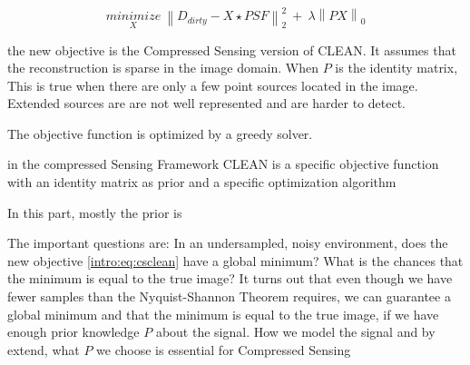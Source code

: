 \begin{equation}\label{intro:eq:csclean}
\underset{X}{minimize} \: \left \| D_{dirty} -X \star PSF \right \|_2^2 \: + \: \lambda \left \| PX \right \|_0
\end{equation}

 the new objective is the Compressed Sensing version of CLEAN. It assumes that the reconstruction is sparse in the image domain. When $P$ is the identity matrix, This is true when there are only a few point sources located in the image. Extended sources are are not well represented and are harder to detect. 
 
 The objective function is optimized by a greedy solver. 

in the compressed Sensing Framework CLEAN is
a specific objective function
with an identity matrix as prior
and a specific optimization algorithm

In this part, mostly the prior is 

The important questions are: In an undersampled, noisy environment, does the new objective \eqref{intro:eq:csclean} have a global minimum? What is the chances that the minimum is equal to the true image? It turns out that even though we have fewer samples than the Nyquist-Shannon Theorem requires, we can guarantee a global minimum and that the minimum is equal to the true image, if we have enough prior knowledge $P$ about the signal. How we model the signal and by extend, what $P$ we choose is essential for Compressed Sensing




